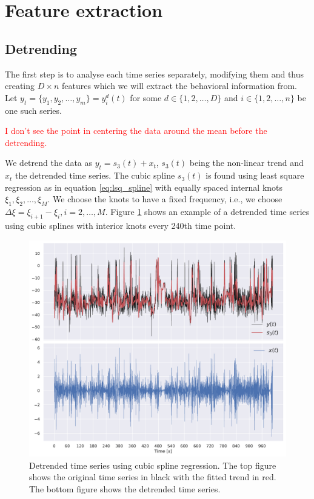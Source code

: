 \documentclass[a4paper, 10pt]{memoir}
\theoremstyle{plain}
\theoremstyle{definition}
\theoremstyle{remark}
\begin{document}
\section{Feature extraction}
\subsection{Detrending}
The first step is to analyse each time series separately, modifying them and thus creating $D \times n$ features which we will extract the behavioral information from.
Let $y_t = \{ y_1, y_2, \hdots, y_m \} = y_i^d(t)$ for some $d \in \{ 1, 2, \hdots, D \}$ and $i \in \{ 1, 2, \hdots, n \}$ be one such series.

\textcolor{red}{I don't see the point in centering the data around the mean before the detrending.}

We detrend the data as $y_t = s_3(t) + x_t$, $s_3(t)$ being the non-linear trend and $x_t$ the detrended time series.
The cubic spline $s_3(t)$ is found using least square regression as in equation \eqref{eq:lsq_spline} with equally spaced internal knots $\xi_1, \xi_2, \hdots, \xi_M$.
We choose the knots to have a fixed frequency, i.e., we choose $\Delta \xi= \xi_{i+1} - \xi_i, i = 2, \hdots, M$.
Figure \ref{fig:detrending_bc} shows an example of a detrended time series using cubic splines with interior knots every 240th time point.


\begin{figure}[tb ]
        \centering
        \includegraphics[width=\linewidth]{./code/figures/detrending/detrending_animal_1_BackPitch.pdf}
        \caption{Detrended time series using cubic spline regression.
        The top figure shows the original time series in black with the fitted trend in red.
The bottom figure shows the detrended time series.}
        \label{fig:detrending_bc}
\end{figure}
\end{document}
